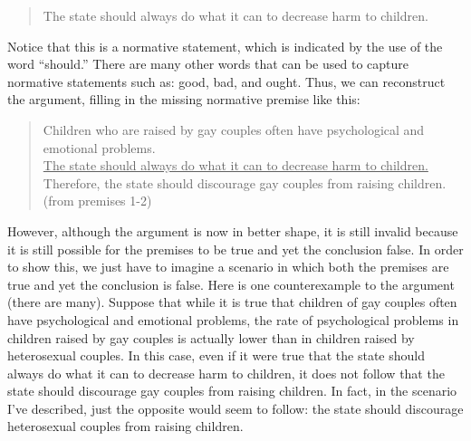 \begin{quote}
The state should always do what it can to decrease harm to children.
\end{quote}


Notice that this is a normative statement, which is indicated by the use of the
word ``should.'' There are many other words that can be used to capture
normative statements such as: good, bad, and ought. Thus, we can reconstruct
the argument, filling in the missing normative premise like this:

\begin{quote}
Children who are raised by gay couples often have psychological and
emotional problems. \\
\underline{The state should always do what it can to decrease harm to children.} \\
Therefore, the state should discourage gay couples from raising
children. (from premises 1-2) \\
\end{quote}


However, although the argument is now in better shape, it is still invalid because
it is still possible for the premises to be true and yet the conclusion false. In
order to show this, we just have to imagine a scenario in which both the
premises are true and yet the conclusion is false. Here is one counterexample to
the argument (there are many). Suppose that while it is true that children of gay
couples often have psychological and emotional problems, the rate of
psychological problems in children raised by gay couples is actually lower than
in children raised by heterosexual couples. In this case, even if it were true that
the state should always do what it can to decrease harm to children, it does not
follow that the state should discourage gay couples from raising children. In
fact, in the scenario I've described, just the opposite would seem to follow: the
state should discourage heterosexual couples from raising children.

